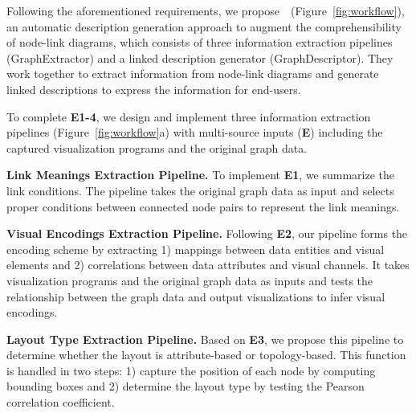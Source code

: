 Following the aforementioned requirements, we propose~\ApproachName~(Figure~\ref{fig:workflow}), an automatic description generation approach to augment the comprehensibility of node-link diagrams, which consists of three information extraction pipelines (GraphExtractor) and a linked description generator (GraphDescriptor). They work together to extract information from node-link diagrams and generate linked descriptions to express the information for end-users.

 To complete \textbf{E1-4}, we design and implement three information extraction pipelines (Figure~\ref{fig:workflow}a) with multi-source inputs (\textbf{E}) including the captured visualization programs and the original graph data.

\begin{compactenum}[\textbf{P}1]
    \item {\bf Link Meanings Extraction Pipeline.}
    To implement \textbf{E1}, we summarize the link conditions. The pipeline takes the original graph data as input and selects proper conditions between connected node pairs to represent the link meanings.
    
    \item {\bf Visual Encodings Extraction Pipeline.}
    Following \textbf{E2}, our pipeline forms the encoding scheme by extracting 1) mappings between data entities and visual elements and 2) correlations between data attributes and visual channels. It takes visualization programs and the original graph data as inputs and tests the relationship between the graph data and output visualizations to infer visual encodings.
    
    
    \item {\bf Layout Type Extraction Pipeline.} Based on \textbf{E3}, we propose this pipeline to determine whether the layout is attribute-based or topology-based. This function is handled in two steps: 1) capture the position of each node by computing bounding boxes and 2) determine the layout type by testing the Pearson correlation coefficient.
\end{compactenum}

